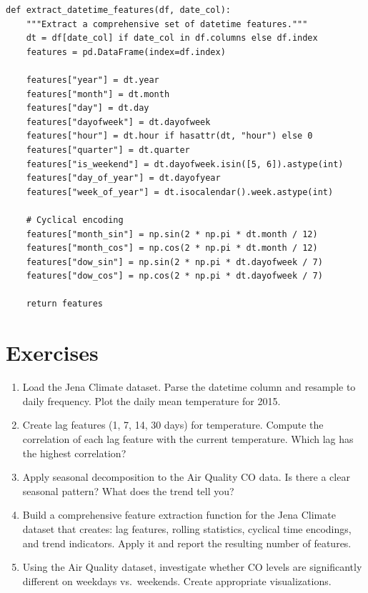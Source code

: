 \begin{verbatim}
def extract_datetime_features(df, date_col):
    """Extract a comprehensive set of datetime features."""
    dt = df[date_col] if date_col in df.columns else df.index
    features = pd.DataFrame(index=df.index)

    features["year"] = dt.year
    features["month"] = dt.month
    features["day"] = dt.day
    features["dayofweek"] = dt.dayofweek
    features["hour"] = dt.hour if hasattr(dt, "hour") else 0
    features["quarter"] = dt.quarter
    features["is_weekend"] = dt.dayofweek.isin([5, 6]).astype(int)
    features["day_of_year"] = dt.dayofyear
    features["week_of_year"] = dt.isocalendar().week.astype(int)

    # Cyclical encoding
    features["month_sin"] = np.sin(2 * np.pi * dt.month / 12)
    features["month_cos"] = np.cos(2 * np.pi * dt.month / 12)
    features["dow_sin"] = np.sin(2 * np.pi * dt.dayofweek / 7)
    features["dow_cos"] = np.cos(2 * np.pi * dt.dayofweek / 7)

    return features
\end{verbatim}

\section{Exercises}

\begin{exercise}
\begin{enumerate}
  \item Load the Jena Climate dataset. Parse the datetime column and resample to daily frequency. Plot the daily mean temperature for 2015.
  \item Create lag features (1, 7, 14, 30 days) for temperature. Compute the correlation of each lag feature with the current temperature. Which lag has the highest correlation?
  \item Apply seasonal decomposition to the Air Quality CO data. Is there a clear seasonal pattern? What does the trend tell you?
  \item Build a comprehensive feature extraction function for the Jena Climate dataset that creates: lag features, rolling statistics, cyclical time encodings, and trend indicators. Apply it and report the resulting number of features.
  \item Using the Air Quality dataset, investigate whether CO levels are significantly different on weekdays vs.\ weekends. Create appropriate visualizations.
\end{enumerate}
\end{exercise}

